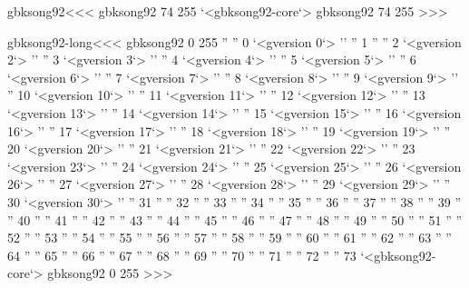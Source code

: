 \<gbksong92\><<<
gbksong92 74 255
`<gbksong92-core`>
gbksong92 74 255
>>>



\<gbksong92-long\><<<
gbksong92 0 255
'' ''           0 `<gversion 0`>
'' ''           1 %
'' ''           2 `<gversion 2`>
'' ''           3 `<gversion 3`>
'' ''           4 `<gversion 4`>
'' ''           5 `<gversion 5`>
'' ''           6 `<gversion 6`>
'' ''           7 `<gversion 7`>
'' ''           8 `<gversion 8`>
'' ''           9 `<gversion 9`>
'' ''          10 `<gversion 10`>
'' ''          11 `<gversion 11`>
'' ''          12 `<gversion 12`>
'' ''          13 `<gversion 13`>
'' ''          14 `<gversion 14`>
'' ''          15 `<gversion 15`>
'' ''          16 `<gversion 16`>
'' ''          17 `<gversion 17`>
'' ''          18 `<gversion 18`>
'' ''          19 `<gversion 19`>
'' ''          20 `<gversion 20`>
'' ''          21 `<gversion 21`>
'' ''          22 `<gversion 22`>
'' ''          23 `<gversion 23`>
'' ''          24 `<gversion 24`>
'' ''          25 `<gversion 25`>
'' ''          26 `<gversion 26`>
'' ''          27 `<gversion 27`>
'' ''          28 `<gversion 28`>
'' ''          29 `<gversion 29`>
'' ''          30 `<gversion 30`>
'' ''          31
'' ''          32
'' ''          33
'' ''          34
'' ''          35
'' ''          36
'' ''          37
'' ''          38
'' ''          39
'' ''          40
'' ''          41
'' ''          42
'' ''          43
'' ''          44
'' ''          45
'' ''          46
'' ''          47
'' ''          48
'' ''          49
'' ''          50
'' ''          51
'' ''          52
'' ''          53
'' ''          54
'' ''          55
'' ''          56
'' ''          57
'' ''          58
'' ''          59
'' ''          60
'' ''          61
'' ''          62
'' ''          63
'' ''          64
'' ''          65
'' ''          66
'' ''          67
'' ''          68
'' ''          69
'' ''          70
'' ''          71
'' ''          72
'' ''          73
`<gbksong92-core`>
gbksong92 0 255
>>>





